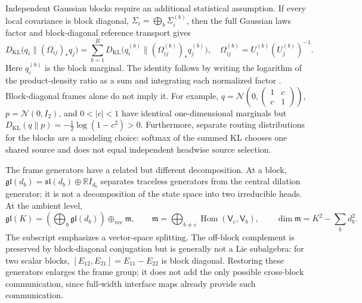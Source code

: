 \documentclass[twoside,11pt]{article}
\begin{document}
Independent Gaussian blocks require an additional statistical assumption. If every local covariance is block diagonal, $\Sigma_i=\bigoplus_b\Sigma_i^{(b)}$, then the full Gaussian laws factor and block-diagonal reference transport gives
\begin{equation}
D_{\mathrm{KL}}\bigl(q_i\|(\Omega_{ij})_*q_j\bigr)
=\sum_{b=1}^{B}D_{\mathrm{KL}}\bigl(q_i^{(b)}\|(\Omega_{ij}^{(b)})_*q_j^{(b)}\bigr),
\quad \Omega_{ij}^{(b)}=U_i^{(b)}(U_j^{(b)})^{-1}.
\label{eq:irrep_block_kl_additivity}
\end{equation}
Here $q_i^{(b)}$ is the block marginal. The identity follows by writing the logarithm of the product-density ratio as a sum and integrating each normalized factor \citep[Thm.~28]{vanErvenHarremoes2014}. Block-diagonal frames alone do not imply it. For example, $q=\mathcal N(0,\left(\begin{smallmatrix}1&c\\c&1\end{smallmatrix}\right))$, $p=\mathcal N(0,I_2)$, and $0<|c|<1$ have identical one-dimensional marginals but $D_{\mathrm{KL}}(q\|p)=-\tfrac12\log(1-c^2)>0$. Furthermore, separate routing distributions for the blocks are a modeling choice: softmax of the summed KL chooses one shared source and does not equal independent headwise source selection.

The frame generators have a related but different decomposition. At a block, $\mathfrak{gl}(d_b)=\mathfrak{sl}(d_b)\oplus\mathbb RI_{d_b}$ separates traceless generators from the central dilation generator; it is not a decomposition of the state space into two irreducible heads. At the ambient level,
\begin{equation}
\mathfrak{gl}(K)=\left(\bigoplus_b\mathfrak{gl}(d_b)\right)
\oplus_{\mathrm{vec}}\mathfrak m,\qquad
\mathfrak m=\bigoplus_{b\ne c}\operatorname{Hom}(\mathsf V_c,\mathsf V_b),\qquad
\dim\mathfrak m=K^2-\sum_bd_b^2.
\label{eq:off_block_vector_complement}
\end{equation}
The subscript emphasizes a vector-space splitting. The off-block complement is preserved by block-diagonal conjugation but is generally not a Lie subalgebra: for two scalar blocks, $[E_{12},E_{21}]=E_{11}-E_{22}$ is block diagonal. Restoring these generators enlarges the frame group; it does not add the only possible cross-block communication, since full-width interface maps already provide such communication.
\end{document}
